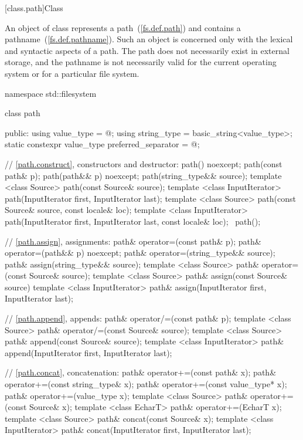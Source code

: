 [class.path]{Class }

\pnum
An object of class  represents a path~(\ref{fs.def.path})
and contains a pathname~(\ref{fs.def.pathname}).
Such an object is concerned only with the lexical and syntactic aspects
of a path. The path does not necessarily exist in external storage, and the
pathname is not necessarily valid for the current operating
system or for a particular file system.

\begin{codeblock}
namespace std::filesystem {
  class path {
  public:
    using value_type  = @\seebelow@;
    using string_type = basic_string<value_type>;
    static constexpr value_type preferred_separator = @\seebelow@;

    // \ref{path.construct}, constructors and destructor:
    path() noexcept;
    path(const path& p);
    path(path&& p) noexcept;
    path(string_type&& source);
    template <class Source>
      path(const Source& source);
    template <class InputIterator>
      path(InputIterator first, InputIterator last);
    template <class Source>
      path(const Source& source, const locale& loc);
    template <class InputIterator>
      path(InputIterator first, InputIterator last, const locale& loc);
   ~path();

    // \ref{path.assign}, assignments:
    path& operator=(const path& p);
    path& operator=(path&& p) noexcept;
    path& operator=(string_type&& source);
    path& assign(string_type&& source);
    template <class Source>
      path& operator=(const Source& source);
    template <class Source>
      path& assign(const Source& source)
    template <class InputIterator>
      path& assign(InputIterator first, InputIterator last);

    // \ref{path.append}, appends:
    path& operator/=(const path& p);
    template <class Source>
      path& operator/=(const Source& source);
    template <class Source>
      path& append(const Source& source);
    template <class InputIterator>
      path& append(InputIterator first, InputIterator last);

    // \ref{path.concat}, concatenation:
    path& operator+=(const path& x);
    path& operator+=(const string_type& x);
    path& operator+=(const value_type* x);
    path& operator+=(value_type x);
    template <class Source>
      path& operator+=(const Source& x);
    template <class EcharT>
      path& operator+=(EcharT x);
    template <class Source>
      path& concat(const Source& x);
    template <class InputIterator>
      path& concat(InputIterator first, InputIterator last);

}}
\end{codeblock}
